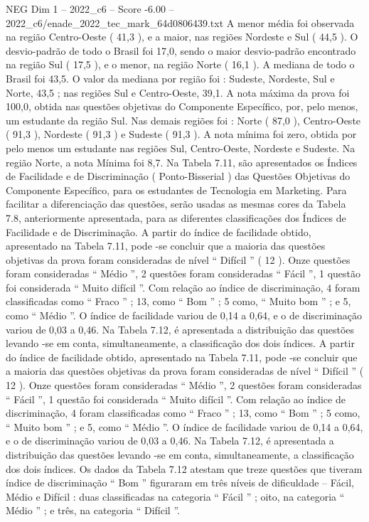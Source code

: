 \begin{textsample}{NEG Dim 1 – 2022\_c6 – Score -6.00 – 2022\_c6/enade\_2022\_tec\_mark\_64d0806439.txt}
A menor média foi observada na região Centro-Oeste ( 41,3 ), e a maior, nas regiões Nordeste e Sul ( 44,5 ).
O desvio-padrão de todo o Brasil foi 17,0, sendo o maior desvio-padrão encontrado na região Sul ( 17,5 ), e o menor, na região Norte ( 16,1 ).
A mediana de todo o Brasil foi 43,5.
O valor da mediana por região foi : Sudeste, Nordeste, Sul e Norte, 43,5 ; nas regiões Sul e Centro-Oeste, 39,1.
A nota máxima da prova foi 100,0, obtida nas questões objetivas do Componente Específico, por, pelo menos, um estudante da região Sul.
Nas demais regiões foi : Norte ( 87,0 ), Centro-Oeste ( 91,3 ), Nordeste ( 91,3 ) e Sudeste ( 91,3 ).
A nota mínima foi zero, obtida por pelo menos um estudante nas regiões Sul, Centro-Oeste, Nordeste e Sudeste.
Na região Norte, a nota Mínima foi 8,7.
Na Tabela 7.11, são apresentados os Índices de Facilidade e de Discriminação ( Ponto-Bisserial ) das Questões Objetivas do Componente Específico, para os estudantes de Tecnologia em Marketing.
Para facilitar a diferenciação das questões, serão usadas as mesmas cores da Tabela 7.8, anteriormente apresentada, para as diferentes classificações dos Índices de Facilidade e de Discriminação.
A partir do índice de facilidade obtido, apresentado na Tabela 7.11, pode -se concluir que a maioria das questões objetivas da prova foram consideradas de nível “ Difícil ” ( 12 ).
Onze questões foram consideradas “ Médio ”, 2 questões foram consideradas “ Fácil ”, 1 questão foi considerada “ Muito difícil ”.
Com relação ao índice de discriminação, 4 foram classificadas como “ Fraco ” ; 13, como “ Bom ” ; 5 como, “ Muito bom ” ; e 5, como “ Médio ”.
O índice de facilidade variou de 0,14 a 0,64, e o de discriminação variou de 0,03 a 0,46.
Na Tabela 7.12, é apresentada a distribuição das questões levando -se em conta, simultaneamente, a classificação dos dois índices.
A partir do índice de facilidade obtido, apresentado na Tabela 7.11, pode -se concluir que a maioria das questões objetivas da prova foram consideradas de nível “ Difícil ” ( 12 ).
Onze questões foram consideradas “ Médio ”, 2 questões foram consideradas “ Fácil ”, 1 questão foi considerada “ Muito difícil ”.
Com relação ao índice de discriminação, 4 foram classificadas como “ Fraco ” ; 13, como “ Bom ” ; 5 como, “ Muito bom ” ; e 5, como “ Médio ”.
O índice de facilidade variou de 0,14 a 0,64, e o de discriminação variou de 0,03 a 0,46.
Na Tabela 7.12, é apresentada a distribuição das questões levando -se em conta, simultaneamente, a classificação dos dois índices.
Os dados da Tabela 7.12 atestam que treze questões que tiveram índice de discriminação “ Bom ” figuraram em três níveis de dificuldade – Fácil, Médio e Difícil : duas classificadas na categoria “ Fácil ” ; oito, na categoria “ Médio ” ; e três, na categoria “ Difícil ”.

\end{textsample}
